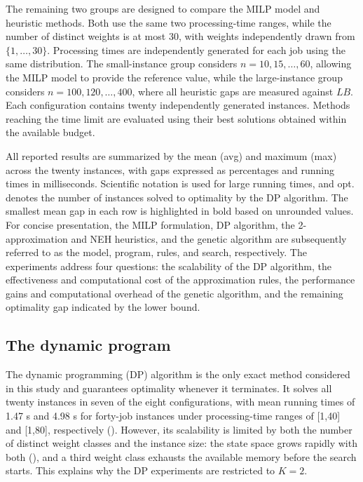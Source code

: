 ﻿\documentclass[12pt]{article}
\begin{document}
\begin{sloppypar}
The remaining two groups are designed to compare the MILP model and heuristic methods. 
Both use the same two processing-time ranges, while the number of distinct weights is at most 30, 
with weights independently drawn from \(\{1,\ldots,30\}\). 
Processing times are independently generated for each job using the same distribution. 
The small-instance group considers \(n=10,15,\ldots,60\), allowing the MILP model to provide the reference value, 
while the large-instance group considers \(n=100,120,\ldots,400\), 
where all heuristic gaps are measured against \(LB\). 
Each configuration contains twenty independently generated instances. 
Methods reaching the time limit are evaluated using their best solutions obtained within the available budget.

All reported results are summarized by the mean (avg) and maximum (max) across the twenty instances, 
with gaps expressed as percentages and running times in milliseconds. 
Scientific notation is used for large running times, and opt. denotes the number of instances solved to optimality 
by the DP algorithm. The smallest mean gap in each row is highlighted in bold based on unrounded values. 
For concise presentation, the MILP formulation, DP algorithm, the 2-approximation and NEH heuristics, 
and the genetic algorithm are subsequently referred to as the model, program, rules, and search, respectively. 
The experiments address four questions: the scalability of the DP algorithm, 
the effectiveness and computational cost of the approximation rules, 
the performance gains and computational overhead of the genetic algorithm, 
and the remaining optimality gap indicated by the lower bound.

\subsection{The dynamic program}

The dynamic programming (DP) algorithm is the only exact method considered in this study and 
guarantees optimality whenever it terminates. 
It solves all twenty instances in seven of the eight configurations, 
with mean running times of 1.47 s and 4.98 s for forty-job instances under processing-time ranges of [1,40] and [1,80], 
respectively (). 
However, its scalability is limited by both the number of distinct weight classes and the instance size: 
the state space grows rapidly with both (), 
and a third weight class exhausts the available memory before the search starts. This explains why the DP experiments 
are restricted to \(K=2\).


\end{sloppypar}
\end{document}
